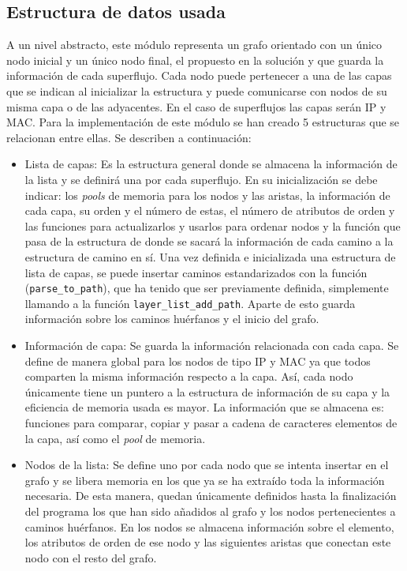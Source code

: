 \documentclass[twoside, 12pt]{epstfg}
\begin{document}
\subsection{Estructura de datos usada}
A un nivel abstracto, este módulo representa un grafo orientado con un único nodo inicial y un único nodo final, el propuesto en la solución y que guarda la información de cada superflujo. Cada nodo puede pertenecer a una de las capas que se indican al inicializar la estructura y puede comunicarse con nodos de su misma capa o de las adyacentes. En el caso de superflujos las capas serán IP y MAC. Para la implementación de este módulo se han creado 5 estructuras que se relacionan entre ellas. Se describen a continuación:
\begin{itemize}
    \item Lista de capas: Es la estructura general donde se almacena la información de la lista y se definirá una por cada superflujo. En su inicialización se debe indicar: los \textit{pools} de memoria para los nodos y las aristas, la información de cada capa, su orden y el número de estas, el número de atributos de orden y las funciones para actualizarlos y usarlos para ordenar nodos y la función que pasa de la estructura de donde se sacará la información de cada camino a la estructura de camino en sí. Una vez definida e inicializada una estructura de lista de capas, se puede insertar caminos estandarizados con la función (\texttt{parse\_to\_path}), que ha tenido que ser previamente definida, simplemente llamando a la función \texttt{layer\_list\_add\_path}. Aparte de esto guarda información sobre los caminos huérfanos y el inicio del grafo.
    \item Información de capa: Se guarda la información relacionada con cada capa. Se define de manera global para los nodos de tipo IP y MAC ya que todos comparten la misma información respecto a la capa. Así, cada nodo únicamente tiene un puntero a la estructura de información de su capa y la eficiencia de memoria usada es mayor. La información que se almacena es: funciones para comparar, copiar y pasar a cadena de caracteres elementos de la capa, así como el \textit{pool} de memoria.
    \item Nodos de la lista: Se define uno por cada nodo que se intenta insertar en el grafo y se libera memoria en los que ya se ha extraído toda la información necesaria. De esta manera, quedan únicamente definidos hasta la finalización del programa los que han sido añadidos al grafo y los nodos pertenecientes a caminos huérfanos.  En los nodos se almacena información sobre el elemento, los atributos de orden de ese nodo y las siguientes aristas que conectan este nodo con el resto del grafo.

\end{itemize}
\end{document}
